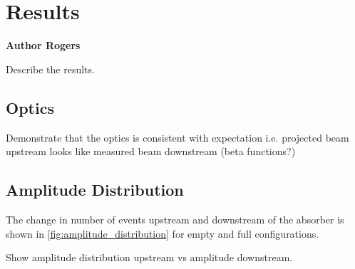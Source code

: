 \section{Results}

\textbf{Author Rogers}

Describe the results.

\subsection{Optics}

Demonstrate that the optics is consistent with expectation i.e. projected beam
upstream looks like measured beam downstream (beta functions?)

\subsection{Amplitude Distribution}

The change in number of events upstream and downstream of the absorber is shown 
in \ref{fig:amplitude_distribution} for empty and full configurations.


Show amplitude distribution upstream vs amplitude downstream.


